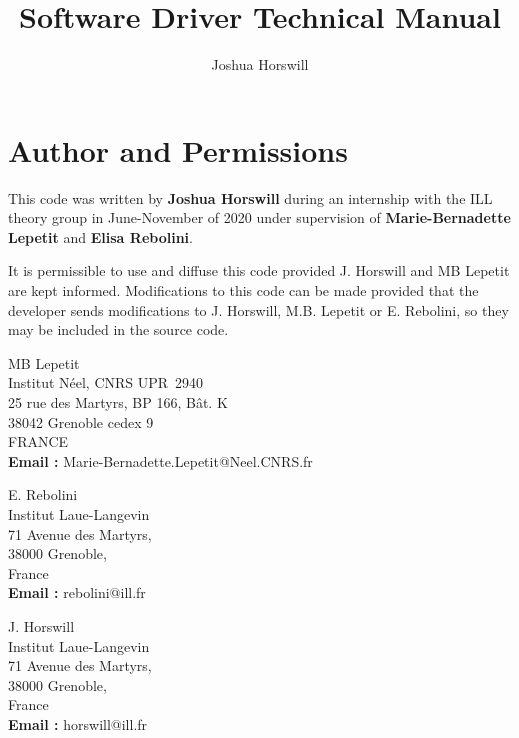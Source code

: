 \documentclass[10pt,a4paper]{article}
\author{Joshua Horswill}
\title{Software Driver Technical Manual}
\begin{document}
\maketitle
\tableofcontents

\newpage 
\section{Author and Permissions}
This code was written by {\bf Joshua Horswill} during an internship with the
ILL theory group in June-November of 2020 under supervision of {\bf
  Marie-Bernadette Lepetit} and {\bf Elisa Rebolini}. 


It is permissible to use and diffuse this code provided J. Horswill and MB
Lepetit are kept informed. Modifications to this code can be made provided
that the developer sends modifications to J. Horswill, M.B. Lepetit or
E. Rebolini, so they may be included in the source code. \\


\noindent 
\begin{minipage}{10cm}
  MB Lepetit \\
  Institut Néel, CNRS UPR~2940 \\                       
  25 rue des Martyrs, BP 166, Bât. K\\
  38042 Grenoble cedex 9 \\
  FRANCE \\[+1ex]                                          
  {\bf Email :} Marie-Bernadette.Lepetit@Neel.CNRS.fr

  E. Rebolini \\
  Institut Laue-Langevin\\            
  71 Avenue des Martyrs,\\  
  38000 Grenoble,\\
  France\\[+1ex]                                          
  {\bf Email :} rebolini@ill.fr  \\
\end{minipage} \hfill 
%
\begin{minipage}{8cm}
  J. Horswill \\
  Institut Laue-Langevin\\            
  71 Avenue des Martyrs,\\  
  38000 Grenoble,\\
  France\\[+1ex]                                          
  {\bf Email :} horswill@ill.fr  
\end{minipage}
      






\end{document}
